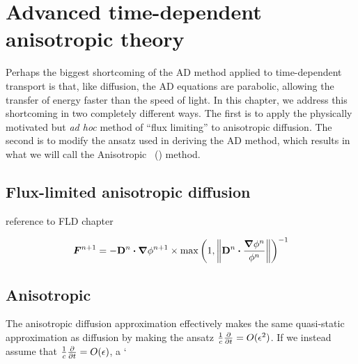 
\chapter{Advanced time-dependent anisotropic theory}\label{chap:aponeDerivation}
Perhaps the biggest shortcoming of the AD method applied to time-dependent
transport is that, like diffusion, the AD equations are parabolic,
allowing the transfer of energy faster than the speed of light. In this chapter,
we address this shortcoming in two completely different ways. The first is to
apply the physically motivated but \emph{ad hoc} method of ``flux limiting'' to
anisotropic diffusion. The second is to modify the ansatz used in deriving the
AD method, which results in what we will call the Anisotropic \Pone\ (\APone)
method.

\section{Flux-limited anisotropic diffusion}

reference to FLD chapter

\begin{equation*}
  \bm{F}^{n+1} = -\mathbf{D}^{n}\bm{\cdot} \bm{\nabla} \phi^{n+1} \times 
  \max\left( 1, \left\| \mathbf{D}^{n}\bm{\cdot} \frac{\bm{\nabla} \phi^{n}}{\phi^{n}} \right\|
  \right)^{-1}
\end{equation*}


\section{Anisotropic \Pone}
The anisotropic diffusion approximation effectively makes the same quasi-static
approximation as diffusion by making the ansatz
$\frac1c\frac{\partial }{\partial t}=O(\epsilon^2)$. If we instead assume that
$\frac1c\frac{\partial }{\partial t}=O(\epsilon)$, a `


